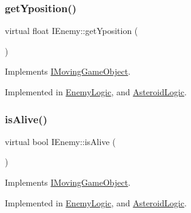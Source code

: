 \mbox{\label{class_i_enemy_a8011be7f510f6630250f8b9529815773}} 
\subsubsection{\texorpdfstring{get\+Yposition()}{getYposition()}}
{\footnotesize\ttfamily virtual float I\+Enemy\+::get\+Yposition (\begin{DoxyParamCaption}{ }\end{DoxyParamCaption})\hspace{0.3cm}{\ttfamily [pure virtual]}}



Implements \hyperlink{class_i_moving_game_object_a153c0017219e17262a9cceddba3f61d6}{I\+Moving\+Game\+Object}.



Implemented in \hyperlink{class_enemy_logic_ae614032054926a4a25ed56f61111392b}{Enemy\+Logic}, and \hyperlink{class_asteroid_logic_a83863c5262a29b2999d04ad443622bbc}{Asteroid\+Logic}.

\mbox{\label{class_i_enemy_a3e44ca5e5fabcfd71b26657eba26e5a2}} 
\subsubsection{\texorpdfstring{is\+Alive()}{isAlive()}}
{\footnotesize\ttfamily virtual bool I\+Enemy\+::is\+Alive (\begin{DoxyParamCaption}{ }\end{DoxyParamCaption})\hspace{0.3cm}{\ttfamily [pure virtual]}}



Implements \hyperlink{class_i_moving_game_object_ab88f75c872699dd1376e5e83f6188e34}{I\+Moving\+Game\+Object}.



Implemented in \hyperlink{class_enemy_logic_a8dd48fa112c41249e46728d7ec8f820e}{Enemy\+Logic}, and \hyperlink{class_asteroid_logic_a18e01f832db4f109799fc01c8c15efcd}{Asteroid\+Logic}.

\mbox{\label{class_i_enemy_a0dbed8e8e15436305b6ede08b618c232}} 
